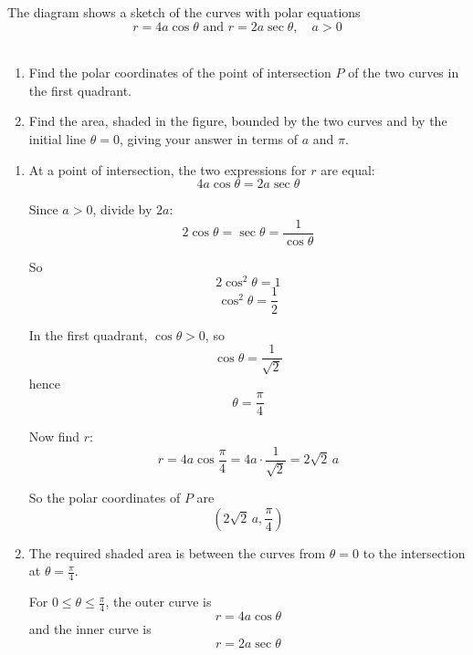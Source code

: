 \documentclass[leqno]{article}
\begin{document}
\begin{enumerate}[
	  label=\textbf{\arabic*.},
	  leftmargin=*,
	  topsep=0pt,
	  partopsep=0pt,
	  parsep=0pt
	]
\begin{figure}[H]
	\end{figure}
	
	
	The diagram shows a sketch of the curves with polar equations
	\[
	r=4a\cos\theta \text{ and } r=2a\sec\theta,\quad a>0
	\] \\
	\begin{enumerate}[label=\textbf{(\alph*)}]
	  \item Find the polar coordinates of the point of intersection $P$ of the two curves in the first quadrant.  \\
	  \item Find the area, shaded in the figure, bounded by the two curves and by the initial line $\theta=0$, giving your answer in terms of $a$ and $\pi$.  \\
	\end{enumerate}
	
	\vspace*{30pt}
	
	\begin{tcolorbox}[colback=white, colframe=scarlet, title={\textbf{Solution}}, breakable, grow to left by=6mm, grow to right by=10mm]
	\begin{enumerate}[label=\textbf{(\alph*)}]
	  \item At a point of intersection, the two expressions for $r$ are equal:
	\[
	4a\cos\theta=2a\sec\theta
	\]
	
	Since $a>0$, divide by $2a$:
	\[
	2\cos\theta=\sec\theta=\frac{1}{\cos\theta}
	\]
	
	So
	\[
	2\cos^2\theta=1
	\]
	\[
	\cos^2\theta=\frac12
	\]
	
	In the first quadrant, $\cos\theta>0$, so
	\[
	\cos\theta=\frac{1}{\sqrt2}
	\]
	hence
	\[
	\theta=\frac{\pi}{4}
	\]
	
	Now find $r$:
	\[
	r=4a\cos\frac{\pi}{4}=4a\cdot \frac{1}{\sqrt2}=2\sqrt2\,a
	\]
	
	So the polar coordinates of $P$ are
	\[
	\boxed{\left(2\sqrt2\,a,\frac{\pi}{4}\right)}
	\]
	
	  \item The required shaded area is between the curves from $\theta=0$ to the intersection at $\theta=\frac{\pi}{4}$.
	
	For $0\le \theta \le \frac{\pi}{4}$, the outer curve is
	\[
	r=4a\cos\theta
	\]
	and the inner curve is
	\[
	r=2a\sec\theta
	\]
	

\end{enumerate}
\end{tcolorbox}
\end{enumerate}
\end{document}

